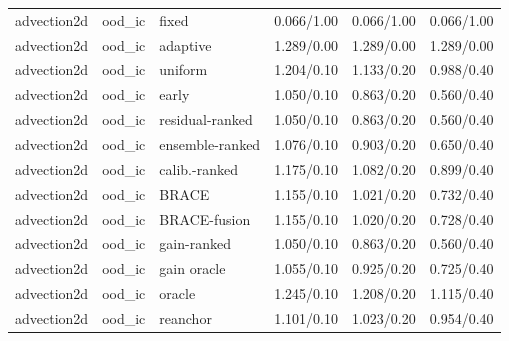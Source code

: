 \begin{tabular}{lllrrr}
advection2d & ood\_ic & fixed & 0.066/1.00 & 0.066/1.00 & 0.066/1.00 \\
advection2d & ood\_ic & adaptive & 1.289/0.00 & 1.289/0.00 & 1.289/0.00 \\
advection2d & ood\_ic & uniform & 1.204/0.10 & 1.133/0.20 & 0.988/0.40 \\
advection2d & ood\_ic & early & 1.050/0.10 & 0.863/0.20 & 0.560/0.40 \\
advection2d & ood\_ic & residual-ranked & 1.050/0.10 & 0.863/0.20 & 0.560/0.40 \\
advection2d & ood\_ic & ensemble-ranked & 1.076/0.10 & 0.903/0.20 & 0.650/0.40 \\
advection2d & ood\_ic & calib.-ranked & 1.175/0.10 & 1.082/0.20 & 0.899/0.40 \\
advection2d & ood\_ic & BRACE & 1.155/0.10 & 1.021/0.20 & 0.732/0.40 \\
advection2d & ood\_ic & BRACE-fusion & 1.155/0.10 & 1.020/0.20 & 0.728/0.40 \\
advection2d & ood\_ic & gain-ranked & 1.050/0.10 & 0.863/0.20 & 0.560/0.40 \\
advection2d & ood\_ic & gain oracle & 1.055/0.10 & 0.925/0.20 & 0.725/0.40 \\
advection2d & ood\_ic & oracle & 1.245/0.10 & 1.208/0.20 & 1.115/0.40 \\
advection2d & ood\_ic & reanchor & 1.101/0.10 & 1.023/0.20 & 0.954/0.40 \\
\midrule
\bottomrule
\end{tabular}
